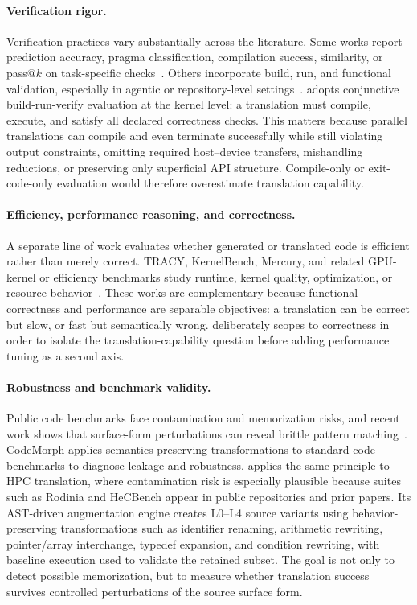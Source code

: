 \paragraph{Verification rigor.}
Verification practices vary substantially across the literature. Some works report prediction accuracy, pragma classification, compilation success, similarity, or pass@$k$ on task-specific checks~\cite{LearningToParallelize2023,OMPify2023,CodeRosetta2024,HPCCoderV2}. Others incorporate build, run, and functional validation, especially in agentic or repository-level settings~\cite{LASSI2024,ParEvalRepo2025,ParaCodex2026}. \parbench{} adopts conjunctive build-run-verify evaluation at the kernel level: a translation must compile, execute, and satisfy all declared correctness checks. This matters because parallel translations can compile and even terminate successfully while still violating output constraints, omitting required host--device transfers, mishandling reductions, or preserving only superficial API structure. Compile-only or exit-code-only evaluation would therefore overestimate translation capability.

\paragraph{Efficiency, performance reasoning, and correctness.}
A separate line of work evaluates whether generated or translated code is efficient rather than merely correct. TRACY, KernelBench, Mercury, and related GPU-kernel or efficiency benchmarks study runtime, kernel quality, optimization, or resource behavior~\cite{TRACY2025,KernelBench2025,Mercury2024}. These works are complementary because functional correctness and performance are separable objectives: a translation can be correct but slow, or fast but semantically wrong. \parbench{} deliberately scopes to correctness in order to isolate the translation-capability question before adding performance tuning as a second axis.

\paragraph{Robustness and benchmark validity.}
Public code benchmarks face contamination and memorization risks, and recent work shows that surface-form perturbations can reveal brittle pattern matching~\cite{SWEbenchIllusion2025,CodeMorph2025,MemorizeOrGeneralize2025}. CodeMorph applies semantics-preserving transformations to standard code benchmarks to diagnose leakage and robustness. \parbench{} applies the same principle to HPC translation, where contamination risk is especially plausible because suites such as Rodinia and HeCBench appear in public repositories and prior papers. Its AST-driven augmentation engine creates L0--L4 source variants using behavior-preserving transformations such as identifier renaming, arithmetic rewriting, pointer/array interchange, typedef expansion, and condition rewriting, with baseline execution used to validate the retained subset. The goal is not only to detect possible memorization, but to measure whether translation success survives controlled perturbations of the source surface form.


